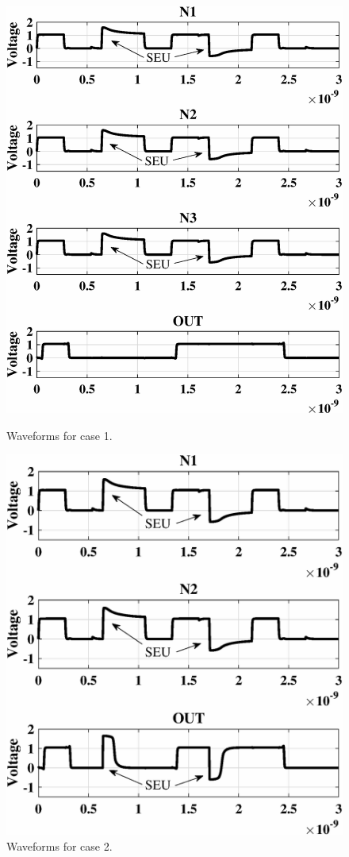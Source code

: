 \begin{figure}[!htbp]
	\centering
	\parbox{4cm}{
		\includegraphics[width=1.15\linewidth]{Figures/TNUPlots/case1.eps}
		\caption{Waveforms for case 1.}
		\label{fig:case1}}
	\qquad
	\begin{minipage}{4cm}
		\includegraphics[width=\linewidth]{Figures/TNUPlots/case2.eps}
		\caption{Waveforms for case 2.}
		\label{fig:case2}
	\end{minipage}
\end{figure}

